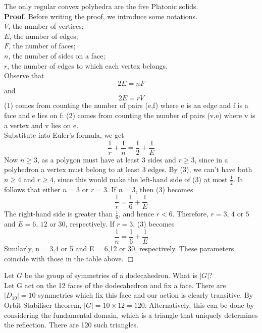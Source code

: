 \documentclass[../main.tex]{subfiles}
\begin{document}
\begin{theorem}\cite{}
The only regular convex polyhedra are the five Platonic solids.\\
\textbf{Proof}. Before writing the proof, we introduce some notations.\\
$V$, the number of vertices;\\
$E$, the number of edges;\\
$F$, the number of faces;\\
$n$, the number of sides on a face;\\
$r$, the number of edges to which each vertex belongs.\\
Observe that 
\begin{equation}\label{eqn_1}
2E=nF
\end{equation}
and
\begin{equation}\label{eqn_2}
2E=rV
\end{equation}
(1) comes from counting the number of pairs (e,f) where e is an edge and f is a face and e lies on f; (2) comes from counting the number of pairs (v,e) where v is a vertex and v lies on e.\\
Substitute into Euler's formula, we get 
\begin{equation}\label{eqn_3}
\frac{1}{r}+\frac{1}{n}=\frac{1}{2}+\frac{1}{E}
\end{equation}
Now $n\geq 3$, as a polygon must have at least $3$ sides and $r\geq 3$, since in a polyhedron a vertex must belong to at least $3$ edges. By (3), we can't have both $n\geq 4$ and $r \geq 4$, since this would make the left-hand side of (3) at most $\frac{1}{2}$.
It follows that either $n = 3$ or $r = 3$.
If $n = 3$, then (3) becomes
\begin{equation}\label{eqn_4}
\frac{1}{r}=\frac{1}{6}+\frac{1}{E}
\end{equation}
The right-hand side is greater than $\frac{1}{6}$, and hence $r < 6$. Therefore, $r = 3$, $4$ or $5$ and $E = 6$, $12$ or $30$, respectively.
If $r = 3$, (3) becomes
\begin{equation}\label{eqn_5}
\frac{1}{n}=\frac{1}{6}+\frac{1}{E}
\end{equation}
Similarly, n = 3,4 or 5 and E = 6,12 or 30, respectively.
These parameters coincide with those in the table above.
\hfill\(\Box\)
\end{theorem}

\begin{example}
Let $G$ be the group of symmetries of a dodecahedron. What is $|G|$?\\
Let G act on the 12 faces of the dodecahedron and fix a face. There are $|D_{10}|=10$ symmetries which fix this face and our action is clearly transitive. By Orbit-Stabiliser theorem, $|G|=10\times12=120.$
Alternatively, this can be done by considering the fundamental domain, which is a triangle that uniquely determines the reflection. There are 120 such triangles.
\end{example}
\end{document}
